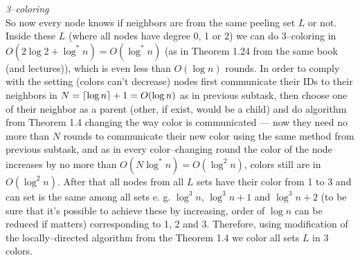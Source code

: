 \documentclass[]{article}
\DeclarePairedDelimiter\ceil{\lceil}{\rceil}
\begin{document}
\begin{enumerate}
	 \textit{3--coloring}\\
	 So now every node knows if neighbors are from the same peeling set $L$ or not. Inside these $L$ (where all nodes have degree 0, 1 or 2) we can do 3--coloring in $O(2\log2+\log^* n) = O(\log^* n)$ (as in Theorem 1.24 from the same book (and lectures)), which is even less than $O(\log n)$ rounds. In order to comply with the setting (colors can't decrease) nodes first communicate their IDs to their neighbors in $N = \ceil{\log n} + 1 = O(\log n)$ as in previous subtask, then choose one of their neighbor as a parent (other, if exist, would be a child) and do algorithm from Theorem 1.4 \cite{Ghaffari} changing the way color is communicated --- now they need no more than $N$ rounds to communicate their new color using the same method from previous subtask, and as in every color--changing round the color of the node increases by no more than $O(N\log^*n) = O(\log^2n)$, colors still are in $O(\log^2n)$.
	 After that all nodes from all $L$ sets have their color from 1 to 3 and can set is the same among all sets e. g. $\log^3 n$, $\log^3 n + 1$ and $\log^3 n + 2$ (to be sure that it's possible to achieve these by increasing, order of $\log n$ can be reduced if matters) corresponding to 1, 2 and 3. Therefore, using modification of the locally--directed algorithm from the Theorem 1.4 we color all sets $L$ in 3 colors.
	  

\end{enumerate}
\end{document}
